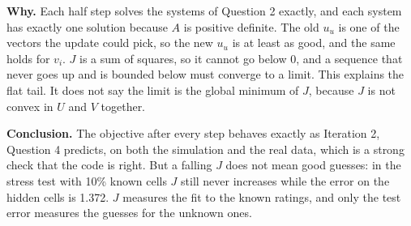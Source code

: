 \textbf{Why.} Each half step solves the systems of Question 2 exactly, and each system has exactly one solution because $A$ is positive definite. The old $u_u$ is one of the vectors the update could pick, so the new $u_u$ is at least as good, and the same holds for $v_i$. $J$ is a sum of squares, so it cannot go below 0, and a sequence that never goes up and is bounded below must converge to a limit. This explains the flat tail. It does not say the limit is the global minimum of $J$, because $J$ is not convex in $U$ and $V$ together.

\textbf{Conclusion.} The objective after every step behaves exactly as Iteration 2, Question 4 predicts, on both the simulation and the real data, which is a strong check that the code is right. But a falling $J$ does not mean good guesses: in the stress test with 10\% known cells $J$ still never increases while the error on the hidden cells is 1.372. $J$ measures the fit to the known ratings, and only the test error measures the guesses for the unknown ones.
